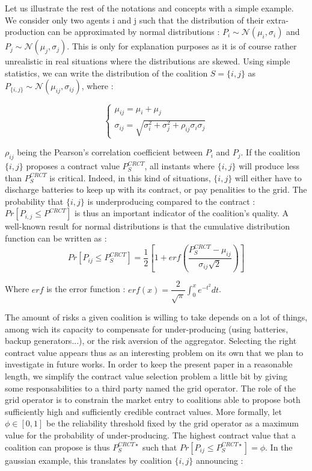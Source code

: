 \documentclass[conference]{IEEEtran}
\begin{document}
Let us illustrate the rest of the notations and concepts with a simple example. We consider only two agents i and j such that the distribution of their extra-production can be approximated by normal distributions : $ P_{i} \sim \mathcal{N}(\mu_{i}, \sigma_{i} ) $ and $ P_{j} \sim \mathcal{N}(\mu_{j}, \sigma_{j} ) $. This is only for explanation purposes as it is of course rather unrealistic in real situations where the distributions are skewed. Using simple statistics, we can write the distribution of the coalition $ S = \{i,j\} $ as $ P_{\{i,j\}} \sim \mathcal{N}(\mu_{ij}, \sigma_{ij}) $, where :

\begin{equation}
\left\{ \begin{array}{lll}
		\mu_{ij} = \mu_{i} + \mu_{j} \\
		\sigma_{ij} = \sqrt{\sigma_{i}^{2} + \sigma_{j}^{2} + \rho_{ij} \sigma_{i} \sigma_{j} }
\end{array} \right.
\end{equation}

$ \rho_{ij} $ being the Pearson's correlation coefficient between $ P_{i} $ and $ P_{j} $. If the coalition $ \{i,j\}$ proposes a contract value $ P_{S}^{CRCT} $, all instants where $ \{i,j\}$ will produce less than $ P_{S}^{CRCT} $ is critical. Indeed, in this kind of situations, $ \{i,j\}$ will either have to discharge batteries to keep up with its contract, or pay penalities to the grid. The probability that $ \{i,j\}$ is underproducing compared to the contract : $ Pr[P_{i,j} \leq P^{CRCT}] $ is thus an important indicator of the coalition's quality. A well-known result for normal distributions is that the cumulative distribution function can be written as :
\begin{equation}
Pr[P_{ij} \leq P_{S}^{CRCT}] = \dfrac{1}{2} \left[ 1+ erf \left( \dfrac{P_{S}^{CRCT} - \mu_{ij}}{\sigma_{ij}\sqrt{2}} \right) \right] 
\end{equation}
 
Where $ erf $ is the error function : $ erf(x) = \dfrac{2}{\sqrt{\pi}}\int_{0}^{x} e^{-t^{2}} dt $.

The amount of risks a given coalition is willing to take depends on a lot of things, among wich its capacity to compensate for under-producing (using batteries, backup generators...), or the risk aversion of the aggregator. Selecting the right contract value appears thus as an interesting problem on its own that we plan to investigate in future works. In order to keep the present paper in a reasonable length, we simplify the contract value selection problem a little bit by giving some responsabilities to a third party named the grid operator. The role of the grid operator is to constrain the market entry to coalitions able to propose both sufficiently high and sufficiently credible contract values. More formally, let $ \phi \in [0,1] $ be the reliability threshold fixed by the grid operator as a maximum value for the probability of under-producing. The highest contract value that a coalition can propose is thus $ P_{S}^{CRCT \star} $ such that $ Pr[P_{ij} \leq P_{S}^{CRCT \star}] = \phi $. In the gaussian example, this translates by coalition $ \{i,j\}$ announcing :
\end{document}
